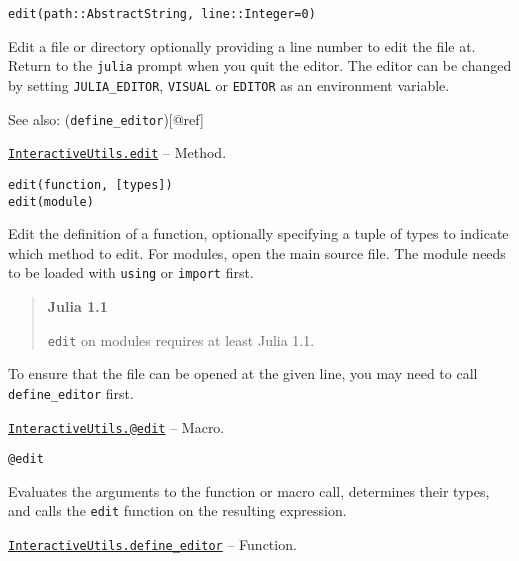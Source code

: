 \begin{adjustwidth}{2em}{0pt}


\begin{verbatim}
edit(path::AbstractString, line::Integer=0)
\end{verbatim}

Edit a file or directory optionally providing a line number to edit the file at. Return to the \texttt{julia} prompt when you quit the editor. The editor can be changed by setting \texttt{JULIA\_EDITOR}, \texttt{VISUAL} or \texttt{EDITOR} as an environment variable.

See also: (\texttt{define\_editor})[@ref]



\end{adjustwidth}
\hypertarget{5817135015306723574}{} 
\hyperlink{5817135015306723574}{\texttt{InteractiveUtils.edit}}  -- {Method.}

\begin{adjustwidth}{2em}{0pt}


\begin{verbatim}
edit(function, [types])
edit(module)
\end{verbatim}

Edit the definition of a function, optionally specifying a tuple of types to indicate which method to edit. For modules, open the main source file. The module needs to be loaded with \texttt{using} or \texttt{import} first.

\begin{quote}
\textbf{Julia 1.1}

\texttt{edit} on modules requires at least Julia 1.1.

\end{quote}
To ensure that the file can be opened at the given line, you may need to call \texttt{define\_editor} first.



\end{adjustwidth}
\hypertarget{15808508619915684107}{} 
\hyperlink{15808508619915684107}{\texttt{InteractiveUtils.@edit}}  -- {Macro.}

\begin{adjustwidth}{2em}{0pt}


\begin{verbatim}
@edit
\end{verbatim}

Evaluates the arguments to the function or macro call, determines their types, and calls the \texttt{edit} function on the resulting expression.



\end{adjustwidth}
\hypertarget{7329923191421757530}{} 
\hyperlink{7329923191421757530}{\texttt{InteractiveUtils.define\_editor}}  -- {Function.}

